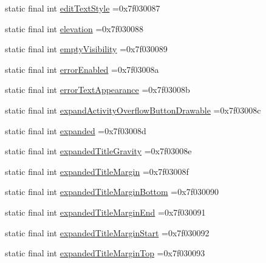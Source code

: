 \begin{DoxyCompactItemize}
\item 
static final int \mbox{\hyperlink{classcom_1_1example_1_1trainawearapplication_1_1_r_1_1attr_a0d7ea3c80416f2672c298d80efee5f33}{edit\+Text\+Style}} =0x7f030087
\item 
static final int \mbox{\hyperlink{classcom_1_1example_1_1trainawearapplication_1_1_r_1_1attr_acf5400ab8dca81e920825996b371cf38}{elevation}} =0x7f030088
\item 
static final int \mbox{\hyperlink{classcom_1_1example_1_1trainawearapplication_1_1_r_1_1attr_ab07bcf3071cb7408cfe75af143eb7c4d}{empty\+Visibility}} =0x7f030089
\item 
static final int \mbox{\hyperlink{classcom_1_1example_1_1trainawearapplication_1_1_r_1_1attr_a2885421d977b6b2cb501458b7d659d2d}{error\+Enabled}} =0x7f03008a
\item 
static final int \mbox{\hyperlink{classcom_1_1example_1_1trainawearapplication_1_1_r_1_1attr_aa5ac9c5c13c5b737a7d1cde79ef03389}{error\+Text\+Appearance}} =0x7f03008b
\item 
static final int \mbox{\hyperlink{classcom_1_1example_1_1trainawearapplication_1_1_r_1_1attr_ad129b8c044eb1bfe0878dcc87e52a6ff}{expand\+Activity\+Overflow\+Button\+Drawable}} =0x7f03008c
\item 
static final int \mbox{\hyperlink{classcom_1_1example_1_1trainawearapplication_1_1_r_1_1attr_abab3db116d5cf1dcdfc6608b62eb3257}{expanded}} =0x7f03008d
\item 
static final int \mbox{\hyperlink{classcom_1_1example_1_1trainawearapplication_1_1_r_1_1attr_a230a48748ba05699bc034fe4b256a0a1}{expanded\+Title\+Gravity}} =0x7f03008e
\item 
static final int \mbox{\hyperlink{classcom_1_1example_1_1trainawearapplication_1_1_r_1_1attr_aae0270732161082361df0f5c6324fdee}{expanded\+Title\+Margin}} =0x7f03008f
\item 
static final int \mbox{\hyperlink{classcom_1_1example_1_1trainawearapplication_1_1_r_1_1attr_a15b5f0e717b45b98eebe4c7308a129ae}{expanded\+Title\+Margin\+Bottom}} =0x7f030090
\item 
static final int \mbox{\hyperlink{classcom_1_1example_1_1trainawearapplication_1_1_r_1_1attr_a71d5de5fa339df031f228e8a7c0f793d}{expanded\+Title\+Margin\+End}} =0x7f030091
\item 
static final int \mbox{\hyperlink{classcom_1_1example_1_1trainawearapplication_1_1_r_1_1attr_acabd195844e822d24e5fb34e631f972e}{expanded\+Title\+Margin\+Start}} =0x7f030092
\item 
static final int \mbox{\hyperlink{classcom_1_1example_1_1trainawearapplication_1_1_r_1_1attr_a9a2aaef8eff80b68623b01e483006acd}{expanded\+Title\+Margin\+Top}} =0x7f030093

\end{DoxyCompactItemize}

